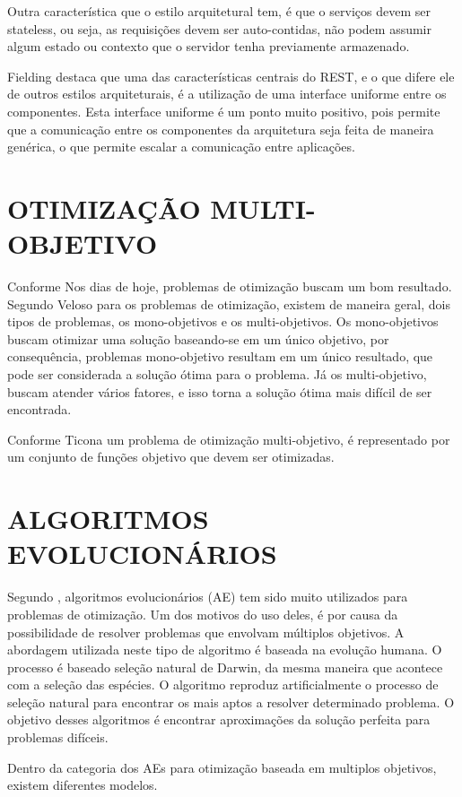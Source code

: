 Outra característica que o estilo arquitetural tem, é que o serviços devem ser stateless, ou seja, as  
requisições devem ser auto-contidas, não podem assumir algum estado ou contexto que o servidor tenha 
previamente armazenado. 

Fielding \cite{fielding} destaca que uma das características centrais do REST, e o que difere ele 
de outros estilos arquiteturais, é a utilização de uma interface uniforme entre os componentes. 
Esta interface uniforme é um ponto muito positivo, pois permite que a comunicação entre os 
componentes da arquitetura seja feita de maneira genérica, o que permite escalar a comunicação 
entre aplicações.

\section{OTIMIZAÇÃO MULTI-OBJETIVO}  
Conforme Nos dias de hoje, problemas de otimização buscam um bom resultado.
Segundo Veloso \cite{veloso} para os problemas de otimização, existem de maneira geral, 
dois tipos de problemas, os mono-objetivos e os multi-objetivos. 
Os mono-objetivos buscam otimizar uma solução baseando-se em um único objetivo, por consequência, 
problemas mono-objetivo resultam em um único resultado, que pode ser considerada a solução ótima para o 
problema. Já os multi-objetivo, buscam atender vários fatores, e isso torna a solução ótima mais 
difícil de ser encontrada.

Conforme Ticona \cite{ticona} um problema de otimização multi-objetivo, é representado por um 
conjunto de funções objetivo que devem ser otimizadas. 
 
\section{ALGORITMOS EVOLUCIONÁRIOS}
Segundo \cite{ticona}, algoritmos evolucionários (AE) tem sido muito utilizados para problemas de 
otimização. Um dos motivos do uso deles, é por causa da possibilidade de resolver problemas que 
envolvam múltiplos objetivos. A abordagem utilizada neste tipo de algoritmo é baseada na 
evolução humana. O processo é baseado seleção natural de Darwin, da mesma maneira que acontece com a 
seleção das espécies. O algoritmo reproduz artificialmente o processo de seleção natural para 
encontrar os mais aptos a resolver determinado problema. O objetivo desses algoritmos é 
encontrar aproximações da solução perfeita para problemas difíceis. 

Dentro da categoria dos AEs para otimização baseada em multiplos objetivos, existem diferentes modelos. 


